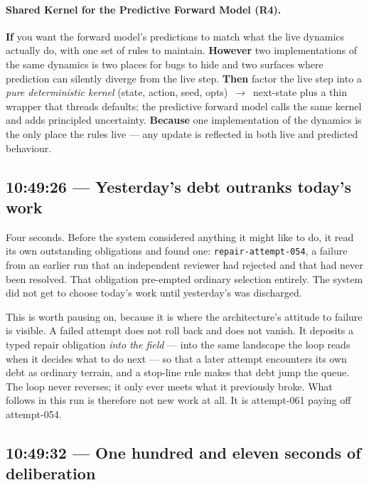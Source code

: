 \paragraph{Shared Kernel for the Predictive Forward Model (R4).} \textbf{If} you want the forward model's predictions to match what the live dynamics actually do, with one set of rules to maintain. \textbf{However} two implementations of the same dynamics is two places for bugs to hide and two surfaces where prediction can silently diverge from the live step. \textbf{Then} factor the live step into a \emph{pure deterministic kernel} (state, action, seed, opts)~$\rightarrow$~next-state plus a thin wrapper that threads defaults; the predictive forward model calls the same kernel and adds principled uncertainty. \textbf{Because} one implementation of the dynamics is the only place the rules live --- any update is reflected in both live and predicted behaviour.

\subsection*{10:49:26 --- Yesterday's debt outranks today's work}

Four seconds.  Before the system considered anything it might like to do, it
read its own outstanding obligations and found one: \texttt{repair-attempt-054},
a failure from an earlier run that an independent reviewer had rejected and that
had never been resolved.  That obligation pre-empted ordinary selection
entirely.  The system did not get to choose today's work until yesterday's was
discharged.

This is worth pausing on, because it is where the architecture's attitude to
failure is visible.  A failed attempt does not roll back and does not vanish.
It deposits a typed repair obligation \emph{into the field} --- into the same
landscape the loop reads when it decides what to do next --- so that a later
attempt encounters its own debt as ordinary terrain, and a stop-line rule makes
that debt jump the queue.  The loop never reverses; it only ever meets what it
previously broke.  What follows in this run is therefore not new work at all.
It is attempt-061 paying off attempt-054.

\subsection*{10:49:32 --- One hundred and eleven seconds of deliberation}

